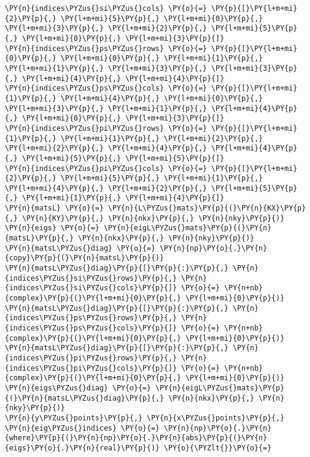\begin{Verbatim}[commandchars=\\\{\}]
\PY{n}{indices\PYZus{}si\PYZus{}cols} \PY{o}{=} \PY{p}{[}\PY{l+m+mi}{2}\PY{p}{,} \PY{l+m+mi}{5}\PY{p}{,} \PY{l+m+mi}{0}\PY{p}{,} \PY{l+m+mi}{3}\PY{p}{,} \PY{l+m+mi}{2}\PY{p}{,} \PY{l+m+mi}{5}\PY{p}{,} \PY{l+m+mi}{0}\PY{p}{,} \PY{l+m+mi}{3}\PY{p}{]}
\PY{n}{indices\PYZus{}ps\PYZus{}rows} \PY{o}{=} \PY{p}{[}\PY{l+m+mi}{0}\PY{p}{,} \PY{l+m+mi}{0}\PY{p}{,} \PY{l+m+mi}{1}\PY{p}{,} \PY{l+m+mi}{1}\PY{p}{,} \PY{l+m+mi}{3}\PY{p}{,} \PY{l+m+mi}{3}\PY{p}{,} \PY{l+m+mi}{4}\PY{p}{,} \PY{l+m+mi}{4}\PY{p}{]}
\PY{n}{indices\PYZus{}ps\PYZus{}cols} \PY{o}{=} \PY{p}{[}\PY{l+m+mi}{1}\PY{p}{,} \PY{l+m+mi}{4}\PY{p}{,} \PY{l+m+mi}{0}\PY{p}{,} \PY{l+m+mi}{3}\PY{p}{,} \PY{l+m+mi}{1}\PY{p}{,} \PY{l+m+mi}{4}\PY{p}{,} \PY{l+m+mi}{0}\PY{p}{,} \PY{l+m+mi}{3}\PY{p}{]}
\PY{n}{indices\PYZus{}pi\PYZus{}rows} \PY{o}{=} \PY{p}{[}\PY{l+m+mi}{1}\PY{p}{,} \PY{l+m+mi}{1}\PY{p}{,} \PY{l+m+mi}{2}\PY{p}{,} \PY{l+m+mi}{2}\PY{p}{,} \PY{l+m+mi}{4}\PY{p}{,} \PY{l+m+mi}{4}\PY{p}{,} \PY{l+m+mi}{5}\PY{p}{,} \PY{l+m+mi}{5}\PY{p}{]}
\PY{n}{indices\PYZus{}pi\PYZus{}cols} \PY{o}{=} \PY{p}{[}\PY{l+m+mi}{2}\PY{p}{,} \PY{l+m+mi}{5}\PY{p}{,} \PY{l+m+mi}{1}\PY{p}{,} \PY{l+m+mi}{4}\PY{p}{,} \PY{l+m+mi}{2}\PY{p}{,} \PY{l+m+mi}{5}\PY{p}{,} \PY{l+m+mi}{1}\PY{p}{,} \PY{l+m+mi}{4}\PY{p}{]}
\PY{n}{matsL} \PY{o}{=} \PY{n}{L\PYZus{}mats}\PY{p}{(}\PY{n}{KX}\PY{p}{,} \PY{n}{KY}\PY{p}{,} \PY{n}{nkx}\PY{p}{,} \PY{n}{nky}\PY{p}{)}
\PY{n}{eigs} \PY{o}{=} \PY{n}{eigL\PYZus{}mats}\PY{p}{(}\PY{n}{matsL}\PY{p}{,} \PY{n}{nkx}\PY{p}{,} \PY{n}{nky}\PY{p}{)}
\PY{n}{matsL\PYZus{}diag} \PY{o}{=} \PY{n}{np}\PY{o}{.}\PY{n}{copy}\PY{p}{(}\PY{n}{matsL}\PY{p}{)}
\PY{n}{matsL\PYZus{}diag}\PY{p}{[}\PY{p}{:}\PY{p}{,} \PY{n}{indices\PYZus{}si\PYZus{}rows}\PY{p}{,} \PY{n}{indices\PYZus{}si\PYZus{}cols}\PY{p}{]} \PY{o}{=} \PY{n+nb}{complex}\PY{p}{(}\PY{l+m+mi}{0}\PY{p}{,} \PY{l+m+mi}{0}\PY{p}{)}
\PY{n}{matsL\PYZus{}diag}\PY{p}{[}\PY{p}{:}\PY{p}{,} \PY{n}{indices\PYZus{}ps\PYZus{}rows}\PY{p}{,} \PY{n}{indices\PYZus{}ps\PYZus{}cols}\PY{p}{]} \PY{o}{=} \PY{n+nb}{complex}\PY{p}{(}\PY{l+m+mi}{0}\PY{p}{,} \PY{l+m+mi}{0}\PY{p}{)}
\PY{n}{matsL\PYZus{}diag}\PY{p}{[}\PY{p}{:}\PY{p}{,} \PY{n}{indices\PYZus{}pi\PYZus{}rows}\PY{p}{,} \PY{n}{indices\PYZus{}pi\PYZus{}cols}\PY{p}{]} \PY{o}{=} \PY{n+nb}{complex}\PY{p}{(}\PY{l+m+mi}{0}\PY{p}{,} \PY{l+m+mi}{0}\PY{p}{)}
\PY{n}{eigs\PYZus{}diag} \PY{o}{=} \PY{n}{eigL\PYZus{}mats}\PY{p}{(}\PY{n}{matsL\PYZus{}diag}\PY{p}{,} \PY{n}{nkx}\PY{p}{,} \PY{n}{nky}\PY{p}{)}
\PY{n}{y\PYZus{}points}\PY{p}{,} \PY{n}{x\PYZus{}points}\PY{p}{,} \PY{n}{eig\PYZus{}indices} \PY{o}{=} \PY{n}{np}\PY{o}{.}\PY{n}{where}\PY{p}{(}\PY{n}{np}\PY{o}{.}\PY{n}{abs}\PY{p}{(}\PY{n}{eigs}\PY{o}{.}\PY{n}{real}\PY{p}{)} \PY{o}{\PYZlt{}}\PY{o}{=}

\end{Verbatim}
